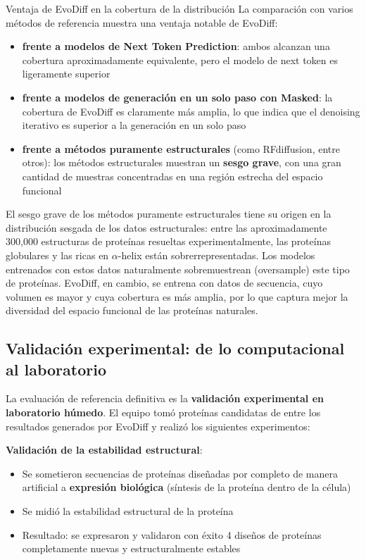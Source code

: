 \begin{importantbox}{Ventaja de EvoDiff en la cobertura de la distribución}
La comparación con varios métodos de referencia muestra una ventaja notable de EvoDiff:
\begin{itemize}
    \item \textbf{frente a modelos de Next Token Prediction}: ambos alcanzan una cobertura aproximadamente equivalente, pero el modelo de next token es ligeramente superior
    \item \textbf{frente a modelos de generación en un solo paso con Masked}: la cobertura de EvoDiff es claramente más amplia, lo que indica que el denoising iterativo es superior a la generación en un solo paso
    \item \textbf{frente a métodos puramente estructurales} (como RFdiffusion, entre otros): los métodos estructurales muestran un \textbf{sesgo grave}, con una gran cantidad de muestras concentradas en una región estrecha del espacio funcional
\end{itemize}
\end{importantbox}

El sesgo grave de los métodos puramente estructurales tiene su origen en la distribución sesgada de los datos estructurales: entre las aproximadamente 300,000 estructuras de proteínas resueltas experimentalmente, las proteínas globulares y las ricas en $\alpha$-helix están sobrerrepresentadas. Los modelos entrenados con estos datos naturalmente sobremuestrean (oversample) este tipo de proteínas. EvoDiff, en cambio, se entrena con datos de secuencia, cuyo volumen es mayor y cuya cobertura es más amplia, por lo que captura mejor la diversidad del espacio funcional de las proteínas naturales.

\subsection{Validación experimental: de lo computacional al laboratorio}

La evaluación de referencia definitiva es la \textbf{validación experimental en laboratorio húmedo}. El equipo tomó proteínas candidatas de entre los resultados generados por EvoDiff y realizó los siguientes experimentos:

\textbf{Validación de la estabilidad estructural}:
\begin{itemize}
    \item Se sometieron secuencias de proteínas diseñadas por completo de manera artificial a \textbf{expresión biológica} (síntesis de la proteína dentro de la célula)
    \item Se midió la estabilidad estructural de la proteína
    \item Resultado: se expresaron y validaron con éxito 4 diseños de proteínas completamente nuevas y estructuralmente estables
\end{itemize}

